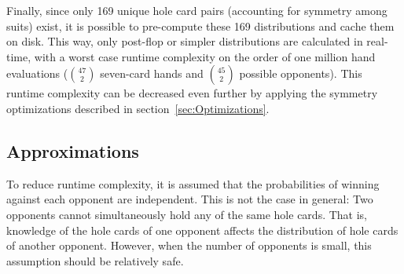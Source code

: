 Finally, since only 169 unique hole card pairs (accounting for symmetry among suits) exist, it is possible to pre-compute these 169 distributions and cache them on disk.
This way, only post-flop or simpler distributions are calculated in real-time, with a worst case runtime complexity on the order of one million hand evaluations ($\binom{47}{2}$ seven-card hands and $\binom{45}{2}$ possible opponents).
This runtime complexity can be decreased even further by applying the symmetry optimizations described in section~\ref{sec:Optimizations}.

\subsection{Approximations}
\label{sec:Approximations}

To reduce runtime complexity, it is assumed that the probabilities of winning against each opponent are independent.
This is not the case in general: Two opponents cannot simultaneously hold any of the same hole cards.
That is, knowledge of the hole cards of one opponent affects the distribution of hole cards of another opponent.
However, when the number of opponents is small, this assumption should be relatively safe.







